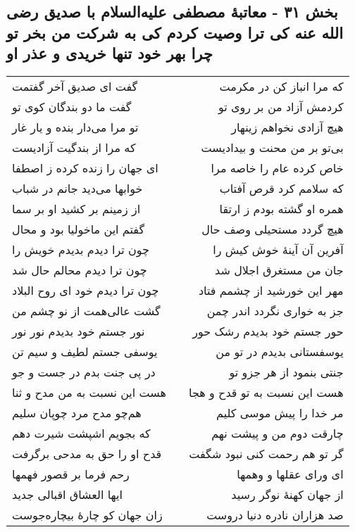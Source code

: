 \begin{center}
\section*{بخش ۳۱ - معاتبهٔ مصطفی علیه‌السلام با صدیق رضی الله عنه کی ترا وصیت کردم کی به شرکت من بخر تو چرا بهر خود تنها خریدی و عذر او}
\label{sec:sh031}
\begin{longtable}{l p{0.5cm} r}
گفت ای صدیق آخر گفتمت
&&
که مرا انباز کن در مکرمت
\\
گفت ما دو بندگان کوی تو
&&
کردمش آزاد من بر روی تو
\\
تو مرا می‌دار بنده و یار غار
&&
هیچ آزادی نخواهم زینهار
\\
که مرا از بندگیت آزادیست
&&
بی‌تو بر من محنت و بیدادیست
\\
ای جهان را زنده کرده ز اصطفا
&&
خاص کرده عام را خاصه مرا
\\
خوابها می‌دید جانم در شباب
&&
که سلامم کرد قرص آفتاب
\\
از زمینم بر کشید او بر سما
&&
همره او گشته بودم ز ارتقا
\\
گفتم این ماخولیا بود و محال
&&
هیچ گردد مستحیلی وصف حال
\\
چون ترا دیدم بدیدم خویش را
&&
آفرین آن آینهٔ خوش کیش را
\\
چون ترا دیدم محالم حال شد
&&
جان من مستغرق اجلال شد
\\
چون ترا دیدم خود ای روح البلاد
&&
مهر این خورشید از چشمم فتاد
\\
گشت عالی‌همت از نو چشم من
&&
جز به خواری نگردد اندر چمن
\\
نور جستم خود بدیدم نور نور
&&
حور جستم خود بدیدم رشک حور
\\
یوسفی جستم لطیف و سیم تن
&&
یوسفستانی بدیدم در تو من
\\
در پی جنت بدم در جست و جو
&&
جنتی بنمود از هر جزو تو
\\
هست این نسبت به من مدح و ثنا
&&
هست این نسبت به تو قدح و هجا
\\
هم‌چو مدح مرد چوپان سلیم
&&
مر خدا را پیش موسی کلیم
\\
که بجویم اشپشت شیرت دهم
&&
چارقت دوم من و پیشت نهم
\\
قدح او را حق به مدحی برگرفت
&&
گر تو هم رحمت کنی نبود شگفت
\\
رحم فرما بر قصور فهمها
&&
ای ورای عقلها و وهمها
\\
ایها العشاق اقبالی جدید
&&
از جهان کهنهٔ نوگر رسید
\\
زان جهان کو چارهٔ بیچاره‌جوست
&&
صد هزاران نادره دنیا دروست

\end{longtable}
\end{center}
